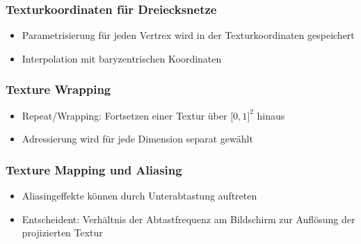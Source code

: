 \subsubsection{Texturkoordinaten für Dreiecksnetze}
\begin{itemize}
	\item Parametrisierung für jeden Vertrex wird in der Texturkoordinaten gespeichert
	\item Interpolation mit baryzentrischen Koordinaten
\end{itemize}

\subsubsection{Texture Wrapping}
\begin{itemize}
	\item Repeat/Wrapping: Fortsetzen einer Textur über \(\lbrack 0,1 \rbrack^2\) hinaus
	\item Adressierung wird für jede Dimension separat gewählt
\end{itemize}

\subsubsection{Texture Mapping und Aliasing}
\begin{itemize}
	\item Aliasingeffekte können durch Unterabtastung auftreten
	\item Entscheident: Verhältnis der Abtastfrequenz am Bildschirm zur Auflösung der projizierten Textur
\end{itemize}

